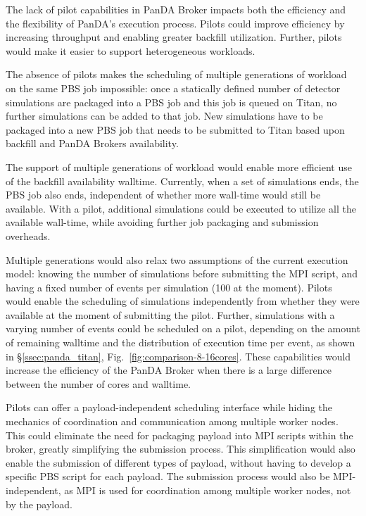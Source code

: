 The lack of pilot capabilities in PanDA Broker impacts both the efficiency
and the flexibility of PanDA's execution process. Pilots could improve
efficiency by increasing throughput and enabling greater backfill
utilization. Further, pilots would make it easier to support heterogeneous
workloads.

The absence of pilots 
makes the scheduling of multiple generations of workload on the same PBS job
impossible: once a statically defined number of detector simulations are
packaged into a PBS job and this job is queued on Titan, no further
simulations can be added to that job. New simulations have to be packaged
into a new PBS job that needs to be submitted to Titan based upon backfill
and PanDA Brokers availability.

The support of multiple generations of workload would enable more efficient
use of the backfill availability walltime. Currently, when a set of
simulations ends, the PBS job also ends, independent of whether more
wall-time would still be available. With a pilot, additional simulations
could be executed to utilize all the available wall-time, while avoiding
further job packaging and submission overheads.

Multiple generations would also relax two assumptions of the current
execution model: knowing the number of simulations before submitting the MPI
script, and having a fixed number of events per simulation (100 at the
moment). Pilots would enable the scheduling of simulations independently from
whether they were available at the moment of submitting the pilot. Further,
simulations with a varying number of events could be scheduled on a pilot,
depending on the amount of remaining walltime and the distribution of
execution time per event, as shown in \S\ref{ssec:panda_titan},
Fig.~\ref{fig:comparison-8-16cores}. These capabilities would increase the
efficiency of the PanDA Broker when there is a large difference between the
number of cores and walltime.

Pilots can offer a payload-independent scheduling interface while hiding the
mechanics of coordination and communication among multiple worker nodes. This
could eliminate the need for packaging payload into MPI scripts within the
broker, greatly simplifying the submission process. This simplification would
also enable the submission of different types of payload, without having to
develop a specific PBS script for each payload. The submission process would
also be MPI-independent, as MPI is used for coordination among multiple
worker nodes, not by the payload.


